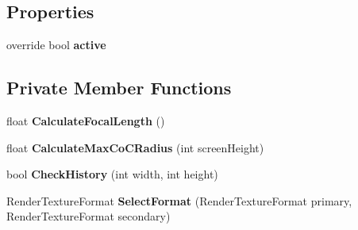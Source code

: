 \subsection*{Properties}
\begin{DoxyCompactItemize}
\item 
\mbox{\label{class_unity_engine_1_1_post_processing_1_1_depth_of_field_component_a8df687892189d109e533c6a4320eca73}} 
override bool {\bfseries active}
\end{DoxyCompactItemize}
\subsection*{Private Member Functions}
\begin{DoxyCompactItemize}
\item 
\mbox{\label{class_unity_engine_1_1_post_processing_1_1_depth_of_field_component_a3804d2270122326a38df1c7e7bb047a1}} 
float {\bfseries Calculate\+Focal\+Length} ()
\item 
\mbox{\label{class_unity_engine_1_1_post_processing_1_1_depth_of_field_component_a70180c7351be3c2a54143a968e8ad702}} 
float {\bfseries Calculate\+Max\+Co\+C\+Radius} (int screen\+Height)
\item 
\mbox{\label{class_unity_engine_1_1_post_processing_1_1_depth_of_field_component_afcc6adb720e779a2bd4ca2b5eeec6064}} 
bool {\bfseries Check\+History} (int width, int height)
\item 
\mbox{\label{class_unity_engine_1_1_post_processing_1_1_depth_of_field_component_a6b27b8635197c400a673f20c71d5ce5b}} 
Render\+Texture\+Format {\bfseries Select\+Format} (Render\+Texture\+Format primary, Render\+Texture\+Format secondary)
\end{DoxyCompactItemize}
